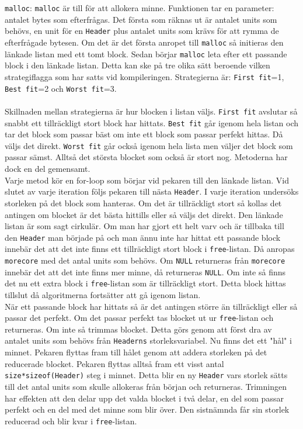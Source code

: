 \documentclass[a4paper]{article}
\begin{document}
\\\\
\texttt{malloc}: \texttt{malloc} är till för att allokera minne. Funktionen tar en parameter: antalet bytes som efterfrågas. Det första som räknas ut är antalet units som behövs, en unit för en \texttt{Header} plus antalet units som krävs för att rymma de efterfrågade bytesen. Om det är det första anropet till \texttt{malloc} så initieras den länkade listan med ett tomt block. Sedan börjar \texttt{malloc} leta efter ett passande block i den länkade listan. Detta kan ske på tre olika sätt beroende vilken strategiflagga som har satts vid kompileringen. Strategierna är: \texttt{First fit}=1, \texttt{Best fit}=2 och \texttt{Worst fit}=3. 
\\\\
Skillnaden mellan strategierna är hur blocken i listan väljs. \texttt{First fit} avslutar så snabbt ett tillräckligt stort block har hittats. \texttt{Best fit} går igenom hela listan och tar det block som passar bäst om inte ett block som passar perfekt hittas. Då väljs det direkt. \texttt{Worst fit} går också igenom hela lista men väljer det block som passar sämst. Alltså det största blocket som också är stort nog. Metoderna har dock en del gemensamt. 
\\
Varje metod kör en for-loop som börjar vid pekaren till den länkade listan. Vid slutet av varje iteration följs pekaren till nästa \texttt{Header}. I varje iteration undersöks storleken på det block som hanteras. Om det är tillräckligt stort så kollas det antingen om blocket är det bästa hittills eller så väljs det direkt. Den länkade listan är som sagt cirkulär. Om man har gjort ett helt varv och är tillbaka till den \texttt{Header} man började på och man ännu inte har hittat ett passande block innebär det att det inte finns ett tillräckligt stort block i \texttt{free}-listan. Då anropas \texttt{morecore} med det antal units som behövs. Om \texttt{NULL} returneras från \texttt{morecore} innebär det att det inte finns mer minne, då returneras \texttt{NULL}. Om inte så finns det nu ett extra block i \texttt{free}-listan som är tillräckligt stort. Detta block hittas tillslut då algoritmerna fortsätter att gå igenom listan.
\\
När ett passande block har hittats så är det antingen större än tillräckligt eller så passar det perfekt. Om det passar perfekt tas blocket ut ur \texttt{free}-listan och returneras. Om inte så trimmas blocket. Detta görs genom att först dra av antalet units som behövs från \texttt{Headerns} storleksvariabel. Nu finns det ett "hål" i minnet. Pekaren flyttas fram till hålet genom att addera storleken på det reducerade blocket. Pekaren flyttas alltså fram ett visst antal \texttt{size*sizeof(Header)} steg i minnet. Detta blir en ny \texttt{Header} vars storlek sätts till det antal units som skulle allokeras från början och returneras. Trimningen har effekten att den delar upp det valda blocket i två delar, en del som passar perfekt och en del med det minne som blir över. Den sistnämnda får sin storlek reducerad och blir kvar i \texttt{free}-listan.
\end{document}

